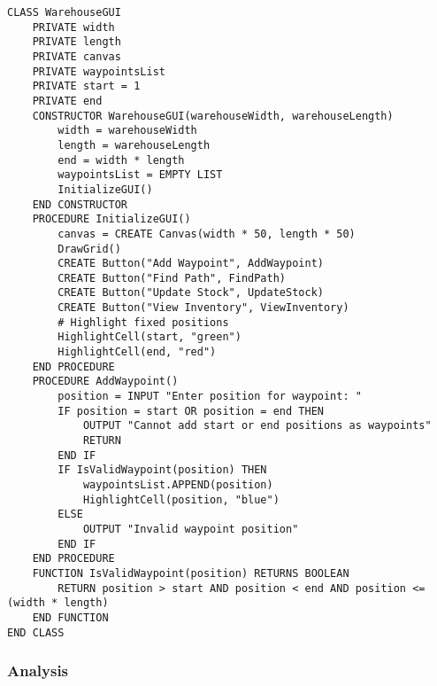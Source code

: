 \newpage

\begin{verbatim}
CLASS WarehouseGUI
    PRIVATE width
    PRIVATE length
    PRIVATE canvas
    PRIVATE waypointsList
    PRIVATE start = 1
    PRIVATE end
    CONSTRUCTOR WarehouseGUI(warehouseWidth, warehouseLength)
        width = warehouseWidth
        length = warehouseLength
        end = width * length
        waypointsList = EMPTY LIST
        InitializeGUI()
    END CONSTRUCTOR
    PROCEDURE InitializeGUI()
        canvas = CREATE Canvas(width * 50, length * 50)
        DrawGrid()
        CREATE Button("Add Waypoint", AddWaypoint)
        CREATE Button("Find Path", FindPath)
        CREATE Button("Update Stock", UpdateStock)
        CREATE Button("View Inventory", ViewInventory)
        # Highlight fixed positions
        HighlightCell(start, "green")
        HighlightCell(end, "red")
    END PROCEDURE
    PROCEDURE AddWaypoint()
        position = INPUT "Enter position for waypoint: "
        IF position = start OR position = end THEN
            OUTPUT "Cannot add start or end positions as waypoints"
            RETURN
        END IF
        IF IsValidWaypoint(position) THEN
            waypointsList.APPEND(position)
            HighlightCell(position, "blue")
        ELSE
            OUTPUT "Invalid waypoint position"
        END IF
    END PROCEDURE
    FUNCTION IsValidWaypoint(position) RETURNS BOOLEAN
        RETURN position > start AND position < end AND position <= (width * length)
    END FUNCTION
END CLASS
\end{verbatim}
\newpage

\subsubsection{Analysis}


